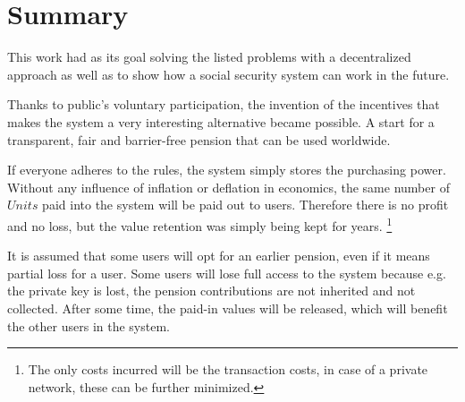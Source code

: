 \section{Summary}

This work had as its goal solving the listed problems with a decentralized approach as well as to show how a social security system can work in the future.

Thanks to public's voluntary participation, the invention of the incentives that makes the system a very interesting alternative became possible. A start for a transparent, fair and barrier-free pension that can be used worldwide.


If everyone adheres to the rules, the system simply stores the purchasing power. Without any influence of inflation or deflation in economics, the same number of $Units$ paid into the system will be paid out to users. Therefore there is no profit and no loss, but the value retention was simply being kept for years. \footnote{ The only costs incurred will be the transaction costs, in case of a private network, these can be further minimized.}

It is assumed that some users will opt for an earlier pension, even if it means partial loss for a user. Some users will lose full access to the system because e.g. the private key is lost, the pension contributions are not inherited and not collected. After some time, the paid-in values will be released, which will benefit the other users in the system.


